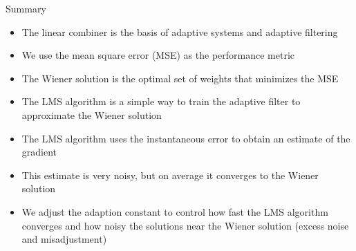 \documentclass[10pt, aspectratio=169]{beamer}
\begin{document}
\begin{frame}{Summary}
	\begin{itemize}
		\item The linear combiner is the basis of adaptive systems and adaptive filtering
		\item We use the mean square error (MSE) as the performance metric
		\item The Wiener solution is the optimal set of weights that minimizes the MSE
		\item The LMS algorithm is a simple way to train the adaptive filter to approximate the Wiener solution
		\item The LMS algorithm uses the instantaneous error to obtain an estimate of the gradient
		\item This estimate is very noisy, but on average it converges to the Wiener solution
		\item We adjust the adaption constant to control how fast the LMS algorithm converges and how noisy the solutions near the Wiener solution (excess noise and misadjustment)
	\end{itemize}
\end{frame}

%
\end{document}
